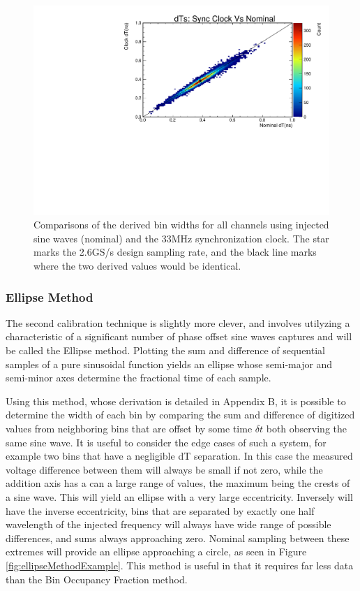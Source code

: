 		
	\begin{figure}
		\includegraphics[width=\textwidth]{figures/nominalDtVsSyncClockDt}
		\caption{Comparisons of the derived bin widths for all channels using injected sine waves (nominal) and the 33MHz synchronization clock.  The star marks the 2.6GS/s design sampling rate, and the black line marks where the two derived values would be identical.}
		\label{fig:dTNominalVsSyncClock}
	\end{figure}


	\subsubsection{Ellipse Method}	
		The second calibration technique is slightly more clever, and involves utilyzing a characteristic of a significant number of phase offset sine waves captures and will be called the Ellipse method.  Plotting the sum and difference of sequential samples of a pure sinusoidal function yields an ellipse whose semi-major and semi-minor axes determine the fractional time of each sample.  
		
		Using this method, whose derivation is detailed in Appendix B, it is possible to determine the width of each bin by comparing the sum and difference of digitized values from neighboring bins that are offset by some time $\delta t$ both observing the same sine wave.  It is useful to consider the edge cases of such a system, for example two bins that have a negligible dT separation.  In this case the measured voltage difference between them will always be small if not zero, while the addition axis has a can a large range of values, the maximum being the crests of a sine wave. This will yield an ellipse with a very large eccentricity.  Inversely will have the inverse eccentricity, bins that are separated by exactly one half wavelength of the injected frequency will always have wide range of possible differences, and sums always approaching zero.  Nominal sampling between these extremes will provide an ellipse approaching a circle, as seen in Figure \ref{fig:ellipseMethodExample}.  This method is useful in that it requires far less data than the Bin Occupancy Fraction method.  
		
